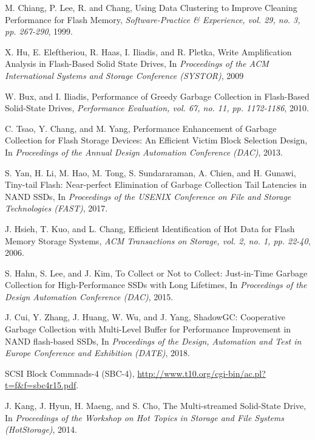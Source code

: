 \newpage

%
\begin{thebibliography}{00}

M. Chiang, P. Lee, R. and Chang,
Using Data Clustering to Improve Cleaning Performance for Flash Memory,
\textit{Software-Practice \& Experience, vol. 29, no. 3, pp. 267-290}, 1999.

X. Hu, E. Eleftheriou, R. Haas, I. Iliadis, and R. Pletka,
Write Amplification Analysis in Flash-Based Solid State Drives,
In \textit{Proceedings of the ACM International Systems and Storage Conference (SYSTOR)}, 2009

W. Bux, and I. Iliadis,
Performance of Greedy Garbage Collection in Flash-Based Solid-State Drives,
\textit{Performance Evaluation, vol. 67, no. 11, pp. 1172-1186}, 2010.

C. Tsao, Y. Chang, and M. Yang,
Performance Enhancement of Garbage Collection for Flash Storage Devices: 
An Efficient Victim Block Selection Design,
In \textit{Proceedings of the Annual Design Automation Conference (DAC)}, 2013.

S. Yan, H. Li, M. Hao, M. Tong, S. Sundararaman, A. Chien, and H. Gunawi,
Tiny-tail Flash: Near-perfect Elimination of Garbage Collection Tail Latencies in NAND SSDs,
In \textit{Proceedings of the USENIX Conference on File and Storage Technologies (FAST)}, 2017.

J. Hsieh, T. Kuo, and L. Chang,
Efficient Identification of Hot Data for Flash Memory Storage Systems,
\textit{ACM Transactions on Storage, vol. 2, no. 1, pp. 22-40}, 2006.

S. Hahn, S. Lee, and J. Kim,
To Collect or Not to Collect: Just-in-Time Garbage Collection for High-Performance SSDs with Long Lifetimes,
In \textit{Proceedings of the Design Automation Conference (DAC)}, 2015.

J. Cui, Y. Zhang, J. Huang, W. Wu, and J. Yang,
ShadowGC: Cooperative Garbage Collection with Multi-Level Buffer for Performance Improvement 
in NAND flash-based SSDs,
In \textit{Proceedings of the Design, Automation and Test in Europe Conference and Exhibition (DATE)}, 2018.

SCSI Block Commnads-4 (SBC-4),
\url{http://www.t10.org/cgi-bin/ac.pl?t=f&f=sbc4r15.pdf}.

J. Kang, J. Hyun, H. Maeng, and S. Cho,
The Multi-streamed Solid-State Drive,
In \textit{Proceedings of the Workshop on Hot Topics in Storage and File Systems (HotStorage)}, 2014.


\end{thebibliography}
